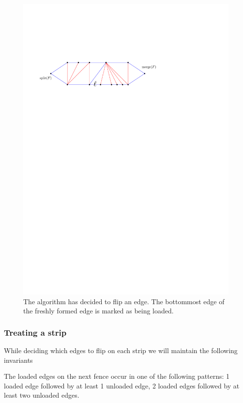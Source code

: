 \begin{figure}[h]
  \centering
  \includegraphics[scale=1]{unifiedAlgo/img/load}
  \caption{The algorithm has decided to flip an edge. The bottommost edge of the freshly formed edge is marked as being loaded. }
  \label{fig:uni:load}
\end{figure}

\subsubsection{Treating a strip}
While deciding which edges to flip on each strip we will maintain the following invariants

\begin{invariants}
  \label{inv:uni:load}
  \item The loaded edges on the next fence occur in one of the following patterns: 1 loaded edge followed by at least 1 unloaded edge, 2 loaded edges followed by at least two unloaded edges.

  \setcounter{invar}{1}
\end{invariants}

